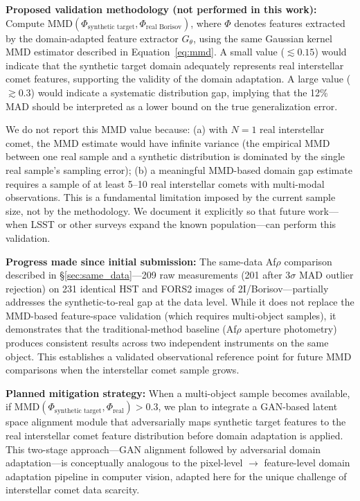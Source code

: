 \documentclass[usenatbib]{mnras}
\begin{document}
\textbf{Proposed validation methodology (not performed in this work):} Compute $\text{MMD}(\Phi_{\text{synthetic target}}, \Phi_{\text{real Borisov}})$, where $\Phi$ denotes features extracted by the domain-adapted feature extractor $G_\theta$, using the same Gaussian kernel MMD estimator described in Equation~\ref{eq:mmd}. A small value ($\lesssim 0.15$) would indicate that the synthetic target domain adequately represents real interstellar comet features, supporting the validity of the domain adaptation. A large value ($\gtrsim 0.3$) would indicate a systematic distribution gap, implying that the 12\% MAD should be interpreted as a lower bound on the true generalization error.

We do not report this MMD value because: (a) with $N=1$ real interstellar comet, the MMD estimate would have infinite variance (the empirical MMD between one real sample and a synthetic distribution is dominated by the single real sample's sampling error); (b) a meaningful MMD-based domain gap estimate requires a sample of at least 5--10 real interstellar comets with multi-modal observations. This is a fundamental limitation imposed by the current sample size, not by the methodology. We document it explicitly so that future work---when LSST or other surveys expand the known population---can perform this validation.

\textbf{Progress made since initial submission:} The same-data Af$\rho$ comparison described in \S\ref{sec:same_data}---209 raw measurements (201 after 3$\sigma$ MAD outlier rejection) on 231 identical HST and FORS2 images of 2I/Borisov---partially addresses the synthetic-to-real gap at the data level. While it does not replace the MMD-based feature-space validation (which requires multi-object samples), it demonstrates that the traditional-method baseline (Af$\rho$ aperture photometry) produces consistent results across two independent instruments on the same object. This establishes a validated observational reference point for future MMD comparisons when the interstellar comet sample grows.

\textbf{Planned mitigation strategy:} When a multi-object sample becomes available, if $\text{MMD}(\Phi_{\text{synthetic target}}, \Phi_{\text{real}}) > 0.3$, we plan to integrate a GAN-based latent space alignment module \citep{ganin16} that adversarially maps synthetic target features to the real interstellar comet feature distribution before domain adaptation is applied. This two-stage approach---GAN alignment followed by adversarial domain adaptation---is conceptually analogous to the pixel-level $\to$ feature-level domain adaptation pipeline in computer vision, adapted here for the unique challenge of interstellar comet data scarcity.
\end{document}
